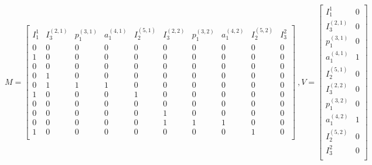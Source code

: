 \[
M =  \left[ \begin{matrix}
  I_1^{1} & I_3^{(2,1)} & p_1^{(3,1)} & a_1^{(4,1)} &I_2^{(5,1)}  & I_3^{(2,2)} & p_1^{(3,2)} & a_1^{(4,2)} & I_2^{(5,2)} & I_3^{2}\\
  0 & 0 & 0 & 0 & 0 & 0 & 0 &0 &0&0  \\
 1 & 0 & 0 & 0 & 0 & 0 & 0&0&0&0\\
 0 & 0 & 0 & 0 & 0 & 0& 0& 0 &0&0\\
 0 & 1 & 0 & 0 & 0 & 0 & 0& 0&0&0\\
 0 & 1 & 1 & 1 & 0 & 0 & 0 & 0&0 &0\\
 1 & 0 & 0 & 0 & 1 & 0 & 0& 0&0&0\\
 0 & 0 & 0 & 0 & 0 & 0 & 0& 0&0&0\\
 0 & 0 & 0 & 0 & 0 & 1 & 0& 0&0&0\\
 0 & 0 & 0 & 0 & 0 & 1 & 1 & 1 &0 &0\\
1 & 0 & 0 & 0 & 0 & 0 & 0 & 0 &1&0 \\
 \end{matrix} \right] 
~ , V = \left [ \begin{matrix}
I_1^{1} &  0 \\
I_3^{(2,1)} &  0 \\
p_1^{(3,1)} & 0 \\
a_1^{(4,1)} &  1 \\
I_2^{(5,1)} & 0 \\
I_3^{(2,2)} & 0 \\
p_1^{(3,2)} &  0 \\
a_1^{(4,2)} & 1 \\
I_2^{(5,2)} & 0 \\
I_3^{2} & 0 \\
\end{matrix} \right ]
\]
%
%
%
